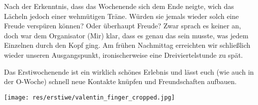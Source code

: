 \begin{multicols*}{2}
Nach der Erkenntnis, dass das Wochenende sich dem Ende neigte, wich das Lächeln jedoch einer wehmütigen Träne.
Würden sie jemals wieder solch eine Freude verspüren können?
Oder überhaupt Freude?
Zwar sprach es keiner an, doch war dem Organisator (Mir) klar, dass es genau das sein musste, was jedem Einzelnen durch den Kopf ging.
Am frühen Nachmittag erreichten wir schließlich wieder unseren Ausgangspunkt, ironischerweise eine Dreiviertelstunde zu spät. 

Das Erstiwochenende ist ein wirklich schönes Erlebnis und lässt euch (wie auch in der O-Woche) schnell neue Kontakte knüpfen und Freundschaften aufbauen.

\vspace{12ex}
\begin{center}
	\texttt{[image: res/erstiwe/valentin\_finger\_cropped.jpg]}
\end{center}
\end{multicols*}
